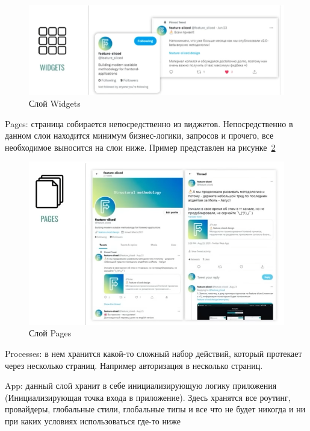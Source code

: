 \begin{figure}
  \includegraphics[scale=1]{styles/diploma/inc/fsd-widgets.png}
  \caption{Слой Widgets}
  \label{fig:fsd-widgets}
\end{figure}

Pages: страница собирается непосредственно из виджетов. Непосредственно в данном слои находится минимум бизнес-логики, запросов и прочего, все необходимое выносится на слои ниже. Пример представлен на рисунке~\ref{fig:fsd-pages}

\begin{figure}
  \includegraphics[scale=0.8]{styles/diploma/inc/fsd-pages.png}
  \caption{Слой Pages}
  \label{fig:fsd-pages}
\end{figure}

Processes: в нем хранится какой-то сложный набор действий, который протекает через несколько страниц. Например авторизация в несколько страниц.

App: данный слой хранит в себе инициализирующую логику приложения (Инициализирующая точка входа в приложение). Здесь хранятся все роутинг, провайдеры, глобальные стили, глобальные типы и все что не будет никогда и ни при каких условиях использоваться где-то ниже
